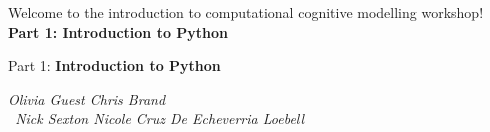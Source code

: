 \documentclass{beamer}
\begin{document}
\begin{frame}
% 
\centering\Huge Welcome to the introduction to computational cognitive modelling workshop! 
\vfill \huge
\centering\textbf{Part 1: Introduction to Python} \normalsize

\vfill
\end{frame}

\begin{frame}
% 
\vfill \Huge
\centering Part 1: \textbf{Introduction to Python} \large

\vfill
\textit{
Olivia Guest \hfill  Chris Brand 
\vspace{0.5cm} \\ \ 
Nick Sexton \hfill Nicole Cruz De Echeverria Loebell } 
\end{frame}
\end{document}
